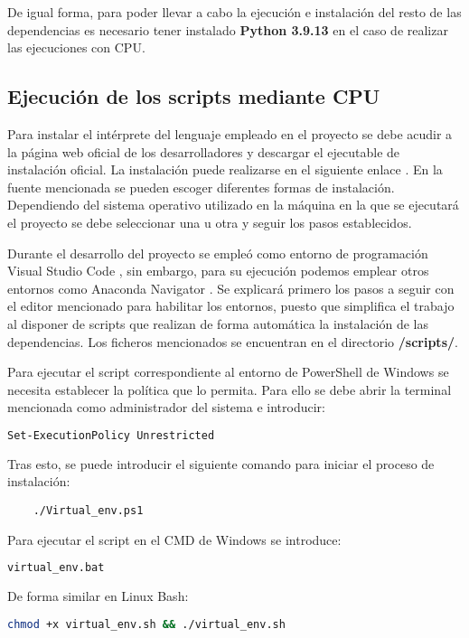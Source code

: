 De igual forma, para poder llevar a cabo la ejecución e instalación del resto de las dependencias es necesario tener instalado \textbf{Python 3.9.13} en el
caso de realizar las ejecuciones con CPU.

\subsection{Ejecución de los scripts mediante CPU}
Para instalar el intérprete del lenguaje empleado en el proyecto se debe acudir a la página web oficial de los desarrolladores y descargar el ejecutable de instalación oficial.
La instalación puede realizarse en el siguiente enlace \cite{misc:python2023}.
En la fuente mencionada se pueden escoger diferentes formas de instalación. Dependiendo del sistema operativo utilizado en la máquina en la que se ejecutará el proyecto se debe seleccionar una
u otra y seguir los pasos establecidos.

Durante el desarrollo del proyecto se empleó como entorno de programación Visual Studio Code \cite{misc:code2023}, sin embargo, para su ejecución podemos emplear otros entornos como 
Anaconda Navigator \cite{misc:conda2023}.
Se explicará primero los pasos a seguir con el editor mencionado para habilitar los entornos, puesto que simplifica el trabajo al disponer de scripts que realizan de forma automática 
la instalación de las dependencias.
Los ficheros mencionados se encuentran en el directorio \textbf{/scripts/}.

Para ejecutar el script correspondiente al entorno de PowerShell de Windows se necesita establecer la política que lo permita. Para ello se debe abrir la terminal mencionada
como administrador del sistema e introducir: 
\begin{lstlisting}[language=Bash]
    Set-ExecutionPolicy Unrestricted    
\end{lstlisting}

Tras esto, se puede introducir el siguiente comando para iniciar el proceso de instalación: 
\begin{lstlisting}
    ./Virtual_env.ps1
\end{lstlisting}

Para ejecutar el script en el CMD de Windows se introduce:
\begin{lstlisting}[language=Bash]
    virtual_env.bat
\end{lstlisting}

De forma similar en Linux Bash:
\begin{lstlisting}[language=Bash]
    chmod +x virtual_env.sh && ./virtual_env.sh    
\end{lstlisting}

